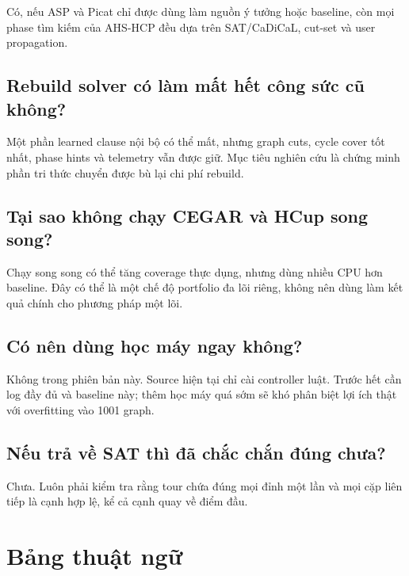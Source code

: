 \documentclass[11pt,a4paper,oneside]{scrreprt}
\begin{document}
Có, nếu ASP và Picat chỉ được dùng làm nguồn ý tưởng hoặc baseline, còn mọi phase tìm kiếm của AHS-HCP đều dựa trên SAT/CaDiCaL, cut-set và user propagation.

\section*{Rebuild solver có làm mất hết công sức cũ không?}

Một phần learned clause nội bộ có thể mất, nhưng graph cuts, cycle cover tốt nhất, phase hints và telemetry vẫn được giữ. Mục tiêu nghiên cứu là chứng minh phần tri thức chuyển được bù lại chi phí rebuild.

\section*{Tại sao không chạy CEGAR và HCup song song?}

Chạy song song có thể tăng coverage thực dụng, nhưng dùng nhiều CPU hơn baseline. Đây có thể là một chế độ portfolio đa lõi riêng, không nên dùng làm kết quả chính cho phương pháp một lõi.

\section*{Có nên dùng học máy ngay không?}

Không trong phiên bản này. Source hiện tại chỉ cài controller luật. Trước hết cần log đầy đủ và baseline này; thêm học máy quá sớm sẽ khó phân biệt lợi ích thật với overfitting vào 1001 graph.

\section*{Nếu trả về SAT thì đã chắc chắn đúng chưa?}

Chưa. Luôn phải kiểm tra rằng tour chứa đúng mọi đỉnh một lần và mọi cặp liên tiếp là cạnh hợp lệ, kể cả cạnh quay về điểm đầu.

\appendix

\chapter{Bảng thuật ngữ}
\end{document}

